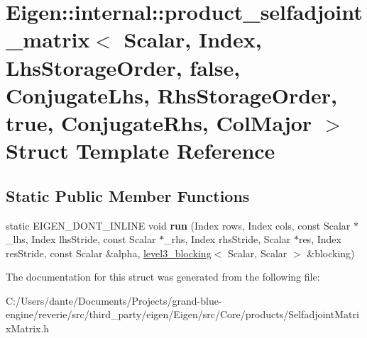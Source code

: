 \hypertarget{struct_eigen_1_1internal_1_1product__selfadjoint__matrix_3_01_scalar_00_01_index_00_01_lhs_storadd08b9e76d992b3a954c3041feed2ed9}{}\section{Eigen\+::internal\+::product\+\_\+selfadjoint\+\_\+matrix$<$ Scalar, Index, Lhs\+Storage\+Order, false, Conjugate\+Lhs, Rhs\+Storage\+Order, true, Conjugate\+Rhs, Col\+Major $>$ Struct Template Reference}
\label{struct_eigen_1_1internal_1_1product__selfadjoint__matrix_3_01_scalar_00_01_index_00_01_lhs_storadd08b9e76d992b3a954c3041feed2ed9}
\subsection*{Static Public Member Functions}
\begin{DoxyCompactItemize}
\item 
\mbox{\label{struct_eigen_1_1internal_1_1product__selfadjoint__matrix_3_01_scalar_00_01_index_00_01_lhs_storadd08b9e76d992b3a954c3041feed2ed9_aa181c8e17f9aecd48411371d2a3fdc8a}} 
static E\+I\+G\+E\+N\+\_\+\+D\+O\+N\+T\+\_\+\+I\+N\+L\+I\+NE void {\bfseries run} (Index rows, Index cols, const Scalar $\ast$\+\_\+lhs, Index lhs\+Stride, const Scalar $\ast$\+\_\+rhs, Index rhs\+Stride, Scalar $\ast$res, Index res\+Stride, const Scalar \&alpha, \mbox{\hyperlink{class_eigen_1_1internal_1_1level3__blocking}{level3\+\_\+blocking}}$<$ Scalar, Scalar $>$ \&blocking)
\end{DoxyCompactItemize}


The documentation for this struct was generated from the following file\+:\begin{DoxyCompactItemize}
\item 
C\+:/\+Users/dante/\+Documents/\+Projects/grand-\/blue-\/engine/reverie/src/third\+\_\+party/eigen/\+Eigen/src/\+Core/products/Selfadjoint\+Matrix\+Matrix.\+h\end{DoxyCompactItemize}

